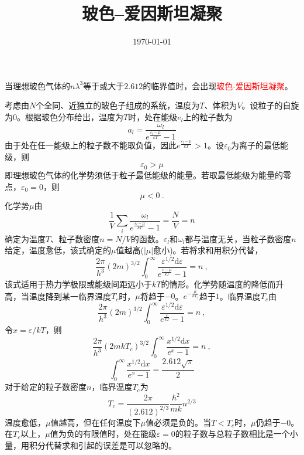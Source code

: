 \documentclass[12pt,a4paper]{article}
\title{玻色--爱因斯坦凝聚}
\author{}
\date{\today}
\newcommand{\dif}{\mathrm{d}}
\begin{document}
\maketitle
\cite{2013热力学} 当理想玻色气体的$n\lambda^3$等于或大于$2.612$的临界值时，会出现\textcolor{red}{玻色-爱因斯坦凝聚}。

考虑由$N$个全同、近独立的玻色子组成的系统，温度为$T$、体积为$V$。设粒子的自旋为$0$。根据玻色分布给出，温度为$T$时，处在能级$e_l$上的粒子数为
\begin{equation}
a_l = \frac{\omega_l}{e^{\frac{\varepsilon_l -\mu}{kT}} -1}
\end{equation}
由于处在任一能级上的粒子数不能取负值，因此$e^{\frac{\varepsilon_l -\mu}{kT}} > 1$。设$\varepsilon_0$为离子的最低能级，则
\begin{equation}
\varepsilon_0 > \mu
\end{equation}
即理想玻色气体的化学势须低于粒子最低能级的能量。若取最低能级为能量的零点，$\varepsilon_0 = 0$，则
\begin{equation}
\mu < 0 ~.
\end{equation}
化学势$\mu$由
\begin{equation}
\frac{1}{V} \sum_i \frac{\omega_l}{e^{\frac{\varepsilon_l -\mu}{kT}} -1} = \frac{N}{V} = n
\end{equation}
确定为温度$T$、粒子数密度$n=N/V$的函数。$\varepsilon_l$和$\omega_l$都与温度无关，当粒子数密度$n$给定，温度愈低，该式确定的$\mu$值越高($|\mu|$愈小)。若将求和用积分代替，
\begin{equation}
\frac{2\pi}{h^3} (2m)^{3/2} \int_0^\infty \frac{\varepsilon^{1/2} \dif \varepsilon}{e^{\frac{\varepsilon -\mu}{kT}} -1} = n ~,
\end{equation}
该式适用于热力学极限或能级间距远小于$kT$的情形。化学势随温度的降低而升高，当温度降到某一临界温度$T_c$时，$\mu$将趋于$-0$。$e^{-\frac{\mu}{kT_c}}$趋于$1$。临界温度$T_c$由
\begin{equation}
\frac{2\pi}{h^3} (2m)^{3/2} \int_0^\infty \frac{\varepsilon^{1/2} \dif \varepsilon}{e^{\frac{\varepsilon}{kT}} -1} = n ~,
\end{equation}
令$x = \varepsilon/kT$，则
\begin{equation}
\frac{2\pi}{h^3} (2m kT_c)^{3/2} \int_0^\infty \frac{x^{1/2} \dif x}{e^{x} -1} = n ~,
\end{equation}
\begin{equation*}
\int_0^\infty \frac{x^{1/2} \dif x}{e^{x} -1} = \frac{2.612 \sqrt{\pi}}{2} 
\end{equation*}
对于给定的粒子数密度$n$，临界温度$T_c$为
\begin{equation}
T_c = \frac{2\pi}{(2.612)^{2/3}} \frac{\hbar^2}{mk} n^{2/3} 
\end{equation}
温度愈低，$\mu$值越高，但在任何温度下$\mu$值必须是负的。当$T < T_c$时，$\mu$仍趋于$-0$。在$T_c$以上，$\mu$值为负的有限值时，处在能级$\varepsilon = 0$的粒子数与总粒子数相比是一个小量，用积分代替求和引起的误差是可以忽略的。
\end{document}
